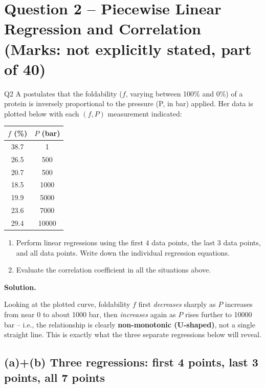 \documentclass[11pt]{article}
\newcommand{\soln}{\par\noindent\textcolor{acolor}{\textbf{Solution.}}\quad}
\begin{document}
\section{Question 2 -- Piecewise Linear Regression and Correlation (Marks: not explicitly stated, part of 40)}
\begin{question}{Q2}
A postulates that the foldability ($f$, varying between 100\% and 0\%) of a protein is inversely proportional to the pressure (P, in bar) applied. Her data is plotted below with each $(f,P)$ measurement indicated:

\begin{center}
\begin{tabular}{c|c}
\toprule
$f$ (\%) & $P$ (bar) \\
\midrule
38.7 & 1 \\
26.5 & 500 \\
20.7 & 500 \\
18.5 & 1000 \\
19.9 & 5000 \\
23.6 & 7000 \\
29.4 & 10000 \\
\bottomrule
\end{tabular}
\end{center}

\begin{enumerate}[label=(\alph*)]
\item Perform linear regressions using the first 4 data points, the last 3 data points, and all data points. Write down the individual regression equations.
\item Evaluate the correlation coefficient in all the situations above.
\end{enumerate}
\end{question}

\soln

Looking at the plotted curve, foldability $f$ first \emph{decreases} sharply as $P$ increases from near 0 to about 1000 bar, then \emph{increases} again as $P$ rises further to 10000 bar -- i.e., the relationship is clearly \textbf{non-monotonic (U-shaped)}, not a single straight line. This is exactly what the three separate regressions below will reveal.

\subsection*{(a)+(b) Three regressions: first 4 points, last 3 points, all 7 points}
\end{document}
